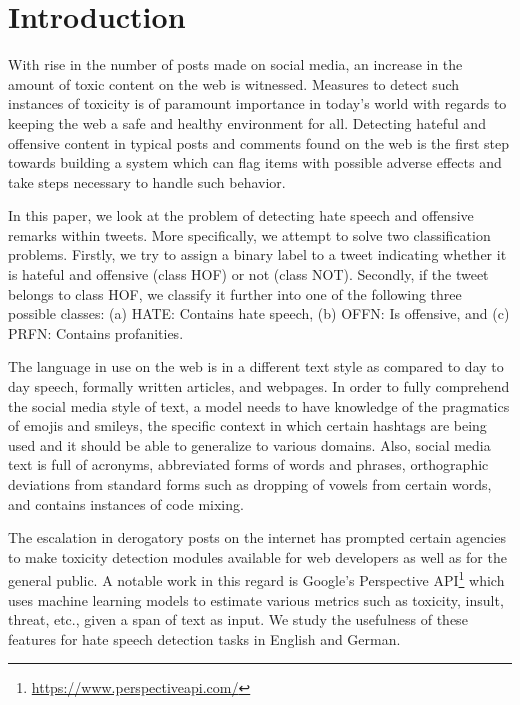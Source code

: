 \documentclass[
]{ceurart}
\begin{document}
\section{Introduction}
With rise in the number of posts made on social media, an increase in the amount of toxic content on the web is witnessed. Measures to detect such instances of toxicity is of paramount importance in today's world with regards to keeping the web a safe and healthy environment for all. Detecting hateful and offensive content in typical posts and comments found on the web is the first step towards building a system which can flag items with possible adverse effects and take steps necessary to handle such behavior.

In this paper, we look at the problem of detecting hate speech and offensive remarks within tweets. More specifically, we attempt to solve two classification problems. Firstly, we try to assign a binary label to a tweet indicating whether it is hateful and offensive (class HOF) or not (class NOT). Secondly, if the tweet belongs to class HOF, we classify it further into one of the following three possible classes: (a) HATE: Contains hate speech, (b) OFFN: Is offensive, and (c) PRFN: Contains profanities.

The language in use on the web is in a different text style as compared to day to day speech, formally written articles, and webpages. In order to fully comprehend the social media style of text, a model needs to have knowledge of the pragmatics of emojis and smileys, the specific context in which certain hashtags are being used and it should be able to generalize to various domains. Also, social media text is full of acronyms, abbreviated forms of words and phrases, orthographic deviations from standard forms such as dropping of vowels from certain words, and contains instances of code mixing.

The escalation in derogatory posts on the internet has prompted certain agencies to make toxicity detection modules available for web developers as well as for the general public. A notable work in this regard is Google's Perspective API\footnote{\url{https://www.perspectiveapi.com/}} which uses machine learning models to estimate various metrics such as toxicity, insult, threat, etc., given a span of text as input. We study the usefulness of these features for hate speech detection tasks in English and German.
\end{document}
